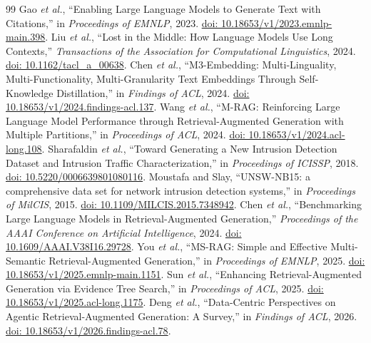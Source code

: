 \begin{thebibliography}{99}
Gao \emph{et al.}, ``Enabling Large Language Models to Generate Text with Citations,'' in \emph{Proceedings of EMNLP}, 2023. \href{https://doi.org/10.18653/v1/2023.emnlp-main.398}{doi: 10.18653/v1/2023.emnlp-main.398}.
Liu \emph{et al.}, ``Lost in the Middle: How Language Models Use Long Contexts,'' \emph{Transactions of the Association for Computational Linguistics}, 2024. \href{https://doi.org/10.1162/tacl_a_00638}{doi: 10.1162/tacl\_a\_00638}.
Chen \emph{et al.}, ``M3-Embedding: Multi-Linguality, Multi-Functionality, Multi-Granularity Text Embeddings Through Self-Knowledge Distillation,'' in \emph{Findings of ACL}, 2024. \href{https://doi.org/10.18653/v1/2024.findings-acl.137}{doi: 10.18653/v1/2024.findings-acl.137}.
Wang \emph{et al.}, ``M-RAG: Reinforcing Large Language Model Performance through Retrieval-Augmented Generation with Multiple Partitions,'' in \emph{Proceedings of ACL}, 2024. \href{https://doi.org/10.18653/v1/2024.acl-long.108}{doi: 10.18653/v1/2024.acl-long.108}.
Sharafaldin \emph{et al.}, ``Toward Generating a New Intrusion Detection Dataset and Intrusion Traffic Characterization,'' in \emph{Proceedings of ICISSP}, 2018. \href{https://doi.org/10.5220/0006639801080116}{doi: 10.5220/0006639801080116}.
Moustafa and Slay, ``UNSW-NB15: a comprehensive data set for network intrusion detection systems,'' in \emph{Proceedings of MilCIS}, 2015. \href{https://doi.org/10.1109/MILCIS.2015.7348942}{doi: 10.1109/MILCIS.2015.7348942}.
Chen \emph{et al.}, ``Benchmarking Large Language Models in Retrieval-Augmented Generation,'' \emph{Proceedings of the AAAI Conference on Artificial Intelligence}, 2024. \href{https://doi.org/10.1609/AAAI.V38I16.29728}{doi: 10.1609/AAAI.V38I16.29728}.
You \emph{et al.}, ``MS-RAG: Simple and Effective Multi-Semantic Retrieval-Augmented Generation,'' in \emph{Proceedings of EMNLP}, 2025. \href{https://doi.org/10.18653/v1/2025.emnlp-main.1151}{doi: 10.18653/v1/2025.emnlp-main.1151}.
Sun \emph{et al.}, ``Enhancing Retrieval-Augmented Generation via Evidence Tree Search,'' in \emph{Proceedings of ACL}, 2025. \href{https://doi.org/10.18653/v1/2025.acl-long.1175}{doi: 10.18653/v1/2025.acl-long.1175}.
Deng \emph{et al.}, ``Data-Centric Perspectives on Agentic Retrieval-Augmented Generation: A Survey,'' in \emph{Findings of ACL}, 2026. \href{https://doi.org/10.18653/v1/2026.findings-acl.78}{doi: 10.18653/v1/2026.findings-acl.78}.
\end{thebibliography}
